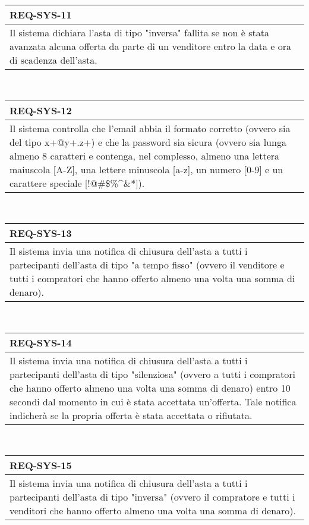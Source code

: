         \begin{tabular}{|p{}|}
            \hline
            \multicolumn{1}{|l|}{\cellcolor{head}\textbf{REQ-SYS-11}} \\
            \hline
            Il sistema dichiara l'asta di tipo "inversa" fallita se non è stata avanzata alcuna offerta da parte di un venditore entro la data e ora di scadenza dell'asta. \\
            \hline
        \end{tabular} \smallskip \\
        \begin{tabular}{|p{}|}
            \hline
            \multicolumn{1}{|l|}{\cellcolor{head}\textbf{REQ-SYS-12}} \\
            \hline
            Il sistema controlla che l'email abbia il formato corretto (ovvero sia del tipo x+@y+.z+) e che la password sia sicura (ovvero sia lunga almeno 8 caratteri e contenga, nel complesso, almeno una lettera maiuscola [A-Z], una lettere minuscola [a-z], un numero [0-9] e un carattere speciale [!@\#\$\%\^{}\&*]). \\
            \hline
        \end{tabular} \smallskip \\
        \begin{tabular}{|p{}|}
            \hline
            \multicolumn{1}{|l|}{\cellcolor{head}\textbf{REQ-SYS-13}} \\
            \hline
            Il sistema invia una notifica di chiusura dell'asta a tutti i partecipanti dell'asta di tipo "a tempo fisso" (ovvero il venditore e tutti i compratori che hanno offerto almeno una volta una somma di denaro). \\
            \hline
        \end{tabular} \smallskip \\
        \begin{tabular}{|p{}|}
            \hline
            \multicolumn{1}{|l|}{\cellcolor{head}\textbf{REQ-SYS-14}} \\
            \hline
            Il sistema invia una notifica di chiusura dell'asta a tutti i partecipanti dell'asta di tipo "silenziosa" (ovvero a tutti i compratori che hanno offerto almeno una volta una somma di denaro) entro 10 secondi dal momento in cui è stata accettata un'offerta. Tale notifica indicherà se la propria offerta è stata accettata o rifiutata. \\
            \hline
        \end{tabular} \smallskip \\
        \begin{tabular}{|p{}|}
            \hline
            \multicolumn{1}{|l|}{\cellcolor{head}\textbf{REQ-SYS-15}} \\
            \hline
            Il sistema invia una notifica di chiusura dell'asta a tutti i partecipanti dell'asta di tipo "inversa" (ovvero il compratore e tutti i venditori che hanno offerto almeno una volta una somma di denaro). \\
            \hline
        \end{tabular} \smallskip \\
